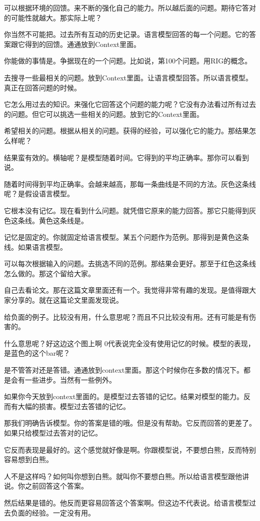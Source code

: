 \documentclass[12pt,a4paper]{article}
\begin{document}
可以根据环境的回馈。来不断的强化自己的能力。所以越后面的问题。期待它答对的可能性就越大。那实际上呢？

你当然不可能把。过去所有互动的历史记录。语言模型回答的每一个问题。它的答案跟它得到的回馈。通通放到Context里面。

你能做的事情是。争据现在的一个问题。比如说，第100个问题。用RIG的概念。

去搜寻一些最相关的问题。放到Context里面。让语言模型回答。所以语言模型。真正在回答问题的时候。

它怎么用过去的知识。来强化它回答这个问题的能力呢？它没有办法看过所有过去的问题。但它可以挑选一些相关的问题。放到它的Context里面。

希望相关的问题。根据从相关的问题。获得的经验，可以强化它的能力。那结果怎么样呢？

结果蛮有效的。横轴呢？是模型随着时间。它得到的平均正确率。那你可以看到说。

随着时间得到平均正确率。会越来越高，那每一条曲线是不同的方法。灰色这条线呢？是假设语言模型。

它根本没有记忆。现在看到什么问题。就凭借它原来的能力回答。那它只能得到灰色这条线。黄色这条线是。

记忆是固定的。你就固定给语言模型。某五个问题作为范例。那得到是黄色这条线。如果语言模型。

可以每次根据输入的问题。去挑选不同的范例。那结果会更好。那至于红色这条线怎么做的。那这个留给大家。

自己去看论文。那在这篇文章里面还有一个。我觉得非常有趣的发现。是值得跟大家分享的。就在这篇论文里面发现说。

给负面的例子。比较没有用，什么意思呢？而且不只比较没有用。还有可能是有伤害的。

什么意思呢？好这边这个图上啊 0代表说完全没有使用记忆的时候。模型的表现，是蓝色的这个bar呢？

是不管答对还是答错。通通放到context里面。那这个时候你在多数的情况下。都是会有一些进步。当然有一些例外。

如果你今天放到context里面的。是模型过去答错的记忆。结果对模型的能力。反而有大幅的损害。模型过去答错的记忆。

那我们明确告诉模型。你的答案是错的哦。但是没有帮助。它反而回答的更差了。如果只给模型过去答对的记忆。

它反而表现是最好的。这个感觉就好像是啊。你跟模型说，不要想白熊，反而特别容易想到白熊。

人不是这样吗？如何叫你想到白熊。就叫你不要想白熊。所以给语言模型跟他讲说。你之前回答这个答案。

然后结果是错的。他反而更容易回答这个答案啊。但这边不代表说。给语言模型过去负面的经验。一定没有用。
\end{document}
